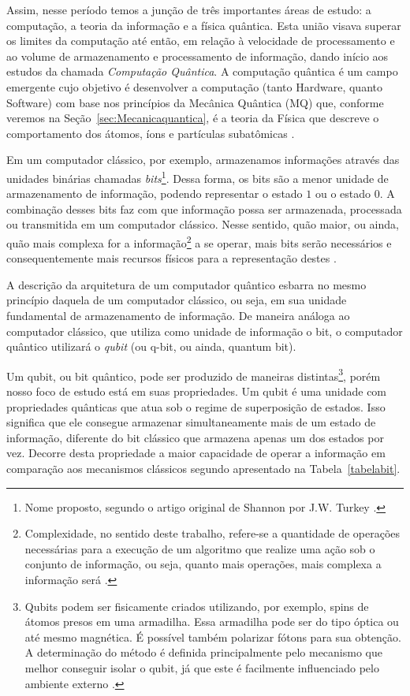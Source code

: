 Assim, nesse período temos a junção de três importantes áreas de estudo: a computação, a teoria da informação e a física quântica. Esta união visava superar os limites da computação até então, em relação à velocidade de processamento e ao volume de armazenamento e processamento de informação, dando início aos estudos da chamada \textit{Computação Quântica}. A computação quântica é um campo emergente cujo objetivo é desenvolver a computação (tanto Hardware, quanto Software) com base nos princípios da Mecânica Quântica (MQ) que, conforme veremos na Seção~\ref{sec:Mecanicaquantica}, é a teoria da Física que descreve o comportamento dos átomos, íons e partículas subatômicas \cite{CompInfoQuantica}.

Em um computador clássico, por exemplo, armazenamos informações através das unidades binárias chamadas \textit{bits}\footnote{Nome proposto, segundo o artigo original de Shannon por J.W. Turkey \cite{MTC}.}. Dessa forma, os bits são a menor unidade de armazenamento de informação, podendo representar o estado \(1\) ou o estado \(0\). A combinação desses bits faz com que informação possa ser armazenada, processada ou transmitida em um computador clássico. Nesse sentido, quão maior, ou ainda, quão mais complexa for a informação\footnote{Complexidade, no sentido deste trabalho, refere-se a quantidade de operações necessárias para a execução de um algoritmo que realize uma ação sob o conjunto de informação, ou seja, quanto mais operações, mais complexa a informação será \cite{MTC}.} a se operar, mais bits serão necessários e consequentemente mais recursos físicos para a representação destes \cite{MTC}.

A descrição da arquitetura de um computador quântico esbarra no mesmo princípio daquela de um computador clássico, ou seja, em sua unidade fundamental de armazenamento de informação. De maneira análoga ao computador clássico, que utiliza como unidade de informação o bit, o computador quântico utilizará o \textit{qubit} (ou q-bit, ou ainda, quantum bit).

Um qubit, ou bit quântico, pode ser produzido de maneiras distintas\footnote{Qubits podem ser fisicamente criados utilizando, por exemplo, spins de átomos presos em uma armadilha. Essa armadilha pode ser do tipo óptica ou até mesmo magnética. É possível também polarizar fótons para sua obtenção. A determinação do método é definida principalmente pelo mecanismo que melhor conseguir isolar o qubit, já que este é facilmente influenciado pelo ambiente externo \cite{materialdidaticomecquantica}.}, porém nosso foco de estudo está em suas propriedades. Um qubit é uma unidade com propriedades quânticas que atua sob o regime de superposição de estados. Isso significa que ele consegue armazenar simultaneamente mais de um estado de informação, diferente do bit clássico que armazena apenas um dos estados por vez. Decorre desta propriedade a maior capacidade de operar a informação em comparação aos mecanismos clássicos segundo apresentado na Tabela~\ref{tabelabit}.

